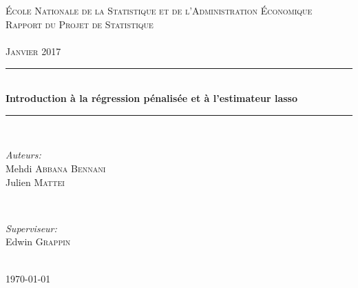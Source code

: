 \documentclass{article}
\begin{document}

\begin{titlepage}

\newcommand{\HRule}{\rule{\linewidth}{0.5mm}} %
\setlength{\topmargin}{0in}
\center %
 
\begin{minipage}{0.4\textwidth}
\begin{flushleft} \large
\hspace*{-0.5cm}
\end{flushleft}
\end{minipage}
~
\begin{minipage}{0.5\textwidth}
\begin{flushright} \large
\hspace*{1.5cm}
\end{flushright}
\end{minipage}\\[1cm]

\textsc{\Large École Nationale de la Statistique et de l'Administration Économique}\\[1.5cm] 
\textsc{{\LARGE Rapport du Projet de Statistique}\\~\\Janvier 2017}\\[1cm]

\HRule \\[1cm]
{ \huge \bfseries Introduction à la régression pénalisée et à l'estimateur lasso}\\[0.4cm] %
\HRule \\[1cm]
 
\begin{minipage}{0.5\textwidth}
\begin{flushleft} \large
\emph{Auteurs:}\\
Mehdi \textsc{Abbana Bennani} \\
Julien \textsc{Mattei} \\
\end{flushleft}
\end{minipage}
~
\begin{minipage}{0.4\textwidth}
\begin{flushright} \large
\emph{Superviseur:} \\
Edwin \textsc{Grappin} \\[0.5cm] 
\end{flushright}
\end{minipage}\\[1.2cm]

{\large \today}\\[0.5cm] %

\vfill %
\end{titlepage}
\end{document}
